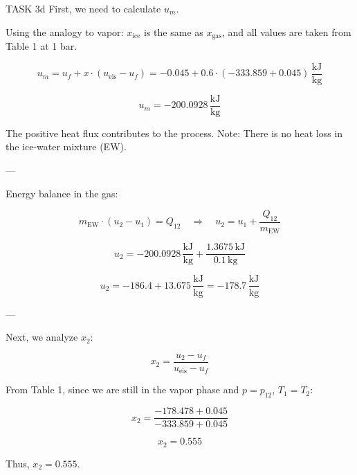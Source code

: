 TASK 3d  
First, we need to calculate \( u_m \).  

Using the analogy to vapor: \( x_{\text{ice}} \) is the same as \( x_{\text{gas}} \), and all values are taken from Table 1 at 1 bar.  

\[
u_m = u_f + x \cdot (u_{\text{eis}} - u_f) = -0.045 + 0.6 \cdot (-333.859 + 0.045) \, \frac{\text{kJ}}{\text{kg}}
\]

\[
u_m = -200.0928 \, \frac{\text{kJ}}{\text{kg}}
\]

The positive heat flux contributes to the process.  
Note: There is no heat loss in the ice-water mixture (EW).  

---

Energy balance in the gas:  

\[
m_{\text{EW}} \cdot (u_2 - u_1) = Q_{12} \quad \Rightarrow \quad u_2 = u_1 + \frac{Q_{12}}{m_{\text{EW}}}
\]

\[
u_2 = -200.0928 \, \frac{\text{kJ}}{\text{kg}} + \frac{1.3675 \, \text{kJ}}{0.1 \, \text{kg}}
\]

\[
u_2 = -186.4 + 13.675 \, \frac{\text{kJ}}{\text{kg}} = -178.7 \, \frac{\text{kJ}}{\text{kg}}
\]

---

Next, we analyze \( x_2 \):  

\[
x_2 = \frac{u_2 - u_f}{u_{\text{eis}} - u_f}
\]

From Table 1, since we are still in the vapor phase and \( p = p_{12} \), \( T_1 = T_2 \):  

\[
x_2 = \frac{-178.478 + 0.045}{-333.859 + 0.045}
\]

\[
x_2 = 0.555
\]

Thus, \( x_2 = 0.555 \).